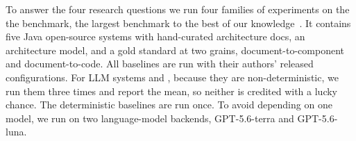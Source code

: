 To answer the four research questions we run four families of experiments on the the \ardoco benchmark, the largest benchmark to the best of our knowledge~\cite{fuchs_establishing_2023}.  
It contains five Java open-source systems with hand-curated architecture docs, an architecture model, and a gold standard at two grains, document-to-component and document-to-code.
All baselines are run with their authors' released configurations.
For \ac{LLM} systems \approach{} and \Artemis{}, because they are non-deterministic, we run them three times and report the mean, so neither is credited with a lucky chance. 
The deterministic baselines are run once.
To avoid depending on one model, we run \approach{} on two language-model backends, GPT-5.6-terra and GPT-5.6-luna. 

